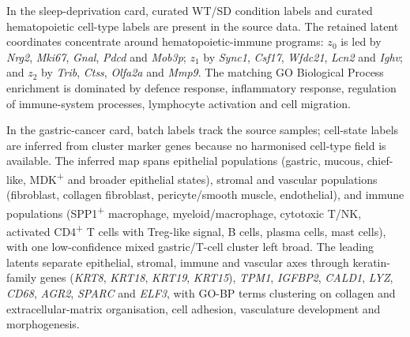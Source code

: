 \documentclass[referee, pdflatex, sn-vancouver-num]{sn-jnl}
\begin{document}
In the sleep-deprivation card, curated WT/SD condition labels and curated hematopoietic cell-type labels are present in the source data. The retained latent coordinates concentrate around hematopoietic-immune programs: $z_0$ is led by \textit{Nrg2}, \textit{Mki67}, \textit{Gnal}, \textit{Pdcd} and \textit{Mob3p}; $z_1$ by \textit{Sync1}, \textit{Csf17}, \textit{Wfdc21}, \textit{Lcn2} and \textit{Ighv}; and $z_2$ by \textit{Trib}, \textit{Ctss}, \textit{Olfa2a} and \textit{Mmp9}. The matching GO Biological Process enrichment is dominated by defence response, inflammatory response, regulation of immune-system processes, lymphocyte activation and cell migration.

In the gastric-cancer card, batch labels track the source samples; cell-state labels are inferred from cluster marker genes because no harmonised cell-type field is available. The inferred map spans epithelial populations (gastric, mucous, chief-like, MDK\textsuperscript{+} and broader epithelial states), stromal and vascular populations (fibroblast, collagen fibroblast, pericyte/smooth muscle, endothelial), and immune populations (SPP1\textsuperscript{+} macrophage, myeloid/macrophage, cytotoxic T/NK, activated CD4\textsuperscript{+} T cells with Treg-like signal, B cells, plasma cells, mast cells), with one low-confidence mixed gastric/T-cell cluster left broad. The leading latents separate epithelial, stromal, immune and vascular axes through keratin-family genes (\textit{KRT8}, \textit{KRT18}, \textit{KRT19}, \textit{KRT15}), \textit{TPM1}, \textit{IGFBP2}, \textit{CALD1}, \textit{LYZ}, \textit{CD68}, \textit{AGR2}, \textit{SPARC} and \textit{ELF3}, with GO-BP terms clustering on collagen and extracellular-matrix organisation, cell adhesion, vasculature development and morphogenesis.
\end{document}

